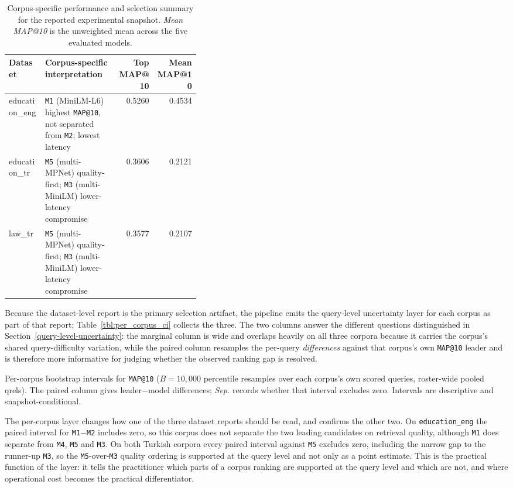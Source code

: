 \begin{table}[htbp]
\caption{Corpus-specific performance and selection summary for the reported experimental snapshot. \emph{Mean MAP@10} is the unweighted mean across the five evaluated models.}\label{tbl:dataset_result_summary}
\centering
\small
\begin{tabular}{@{}l>{\raggedright\arraybackslash}p{0.38\linewidth}rr@{}}
\toprule
Dataset & Corpus-specific interpretation & Top MAP@10 & Mean MAP@10 \\
\midrule
education\_eng & \texttt{M1} (MiniLM-L6) highest \texttt{MAP@10}, not separated from \texttt{M2}; lowest latency & 0.5260 & 0.4534 \\
education\_tr & \texttt{M5} (multi-MPNet) quality-first; \texttt{M3} (multi-MiniLM) lower-latency compromise & 0.3606 & 0.2121 \\
law\_tr & \texttt{M5} (multi-MPNet) quality-first; \texttt{M3} (multi-MiniLM) lower-latency compromise & 0.3577 & 0.2107 \\
\bottomrule
\end{tabular}
\end{table}

Because the dataset-level report is the primary selection artifact, the pipeline emits the query-level uncertainty layer for each corpus as part of that report; Table~\ref{tbl:per_corpus_ci} collects the three. The two columns answer the different questions distinguished in Section~\ref{query-level-uncertainty}: the marginal column is wide and overlaps heavily on all three corpora because it carries the corpus's shared query-difficulty variation, while the paired column resamples the per-query \emph{differences} against that corpus's own \texttt{MAP@10} leader and is therefore more informative for judging whether the observed ranking gap is resolved.

\begin{table}[htbp]
\caption{Per-corpus bootstrap intervals for \texttt{MAP@10} ($B=10{,}000$ percentile resamples over each corpus's own scored queries, roster-wide pooled qrels). The paired column gives leader$-$model differences; \emph{Sep.} records whether that interval excludes zero. Intervals are descriptive and snapshot-conditional.}\label{tbl:per_corpus_ci}
\centering
\small

\end{table}

The per-corpus layer changes how one of the three dataset reports should be read, and confirms the other two. On \texttt{education\_eng} the paired interval for \texttt{M1}$-$\texttt{M2} includes zero, so this corpus does not separate the two leading candidates on retrieval quality, although \texttt{M1} does separate from \texttt{M4}, \texttt{M5} and \texttt{M3}. On both Turkish corpora every paired interval against \texttt{M5} excludes zero, including the narrow gap to the runner-up \texttt{M3}, so the \texttt{M5}-over-\texttt{M3} quality ordering is supported at the query level and not only as a point estimate. This is the practical function of the layer: it tells the practitioner which parts of a corpus ranking are supported at the query level and which are not, and where operational cost becomes the practical differentiator.

